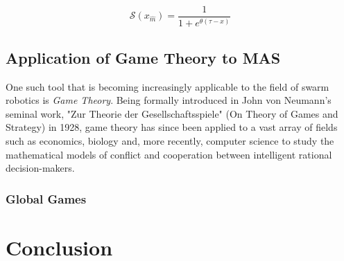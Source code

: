 \documentclass[11pt, onecolumn, compsoc, letterpaper]{article}
\newcommand{\sig}{\mathcal{S}}
\newcommand{\xm}{x_{\hat{m}}}
\begin{document}
\begin{equation}
	\sig(\xm) = \frac{1}{1 + e^{\theta(\tau - x)}}
\end{equation}


\subsection{Application of Game Theory to MAS}
One such tool that is becoming increasingly applicable to the field of swarm robotics is \emph{Game Theory}. Being formally introduced in John von Neumann's seminal work, "Zur Theorie der Gesellschaftsspiele" (On Theory of Games and Strategy) in 1928, game theory has since been applied to a vast array of fields such as economics, biology and, more recently, computer science to study the mathematical models of conflict and cooperation between intelligent rational decision-makers.

\subsubsection{Global Games}



\section{Conclusion}

%


\end{document}
